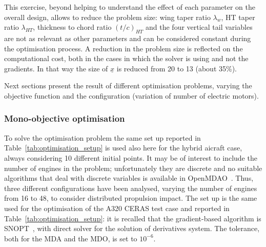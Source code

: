 This exercise, beyond helping to understand the effect of each parameter on the overall design, allows to reduce the problem size: wing taper ratio $\lambda_{w}$, HT taper ratio $\lambda_{HT}$, thickness to chord ratio $(t/c)_{HT}$ and the four vertical tail variables are not as relevant as other parameters and can be considered constant during the optimisation process.
A reduction in the problem size is reflected on the computational cost, both in the cases in which the solver is using and not the gradients.
In that way the size of $\underline{x}$ is reduced from 20 to 13 (about 35\%).

Next sections present the result of different optimisation problems, varying the objective function and the configuration (variation of number of electric motors). 

\subsubsection{Mono-objective optimisation}
\label{subsubsec:chap3_hybrid_mono_optim}

To solve the optimisation problem the same set up reported in Table~\ref{tab:optimisation_setup} is used also here for the hybrid aicraft case, always considering 10 different initial points. 
It may be of interest to include the number of engines in the problem; unfortunately they are discrete and no suitable algorithms that deal with discrete variables is available in OpenMDAO~\cite{bib:belotti}. 
Thus, three different configurations have been analysed, varying the number of engines from 16 to 48, to consider distributed propulsion impact. 
The set up is the same used for the optimisation of the A320 CERAS test case and reported in Table~\ref{tab:optimisation_setup}: it is recalled that the gradient-based algorithm is SNOPT~\cite{bib:snopt}, with direct solver for the solution of derivatives system. 
The tolerance, both for the MDA and the MDO, is set to $10^{-6}$.

